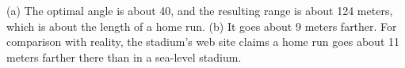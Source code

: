 (a) The optimal angle is about 40\degunit, and the resulting range
is about 124 meters, which is about the length of a home run.
(b) It goes about 9 meters farther. For comparison with
reality, the stadium's web site claims a home run goes about 11 meters farther there
than in a sea-level stadium.



